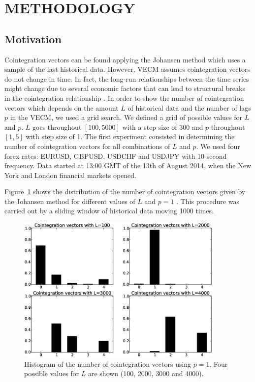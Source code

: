 \section{\uppercase{Methodology}} \label{sec:methodology}
\subsection{Motivation} \label{sec:proposal}

Cointegration vectors can be found applying the Johansen method which uses a
sample of the last historical data. However, VECM assumes cointegration vectors do not change in time.
In fact, the long-run relationships between the time series might change due to
several economic factors that can lead to structural breaks in the cointegration
relationship \cite{gregoryETal1996}. 
In order to show the number of cointegration vectors which depends on 
the amount $L$ of historical data and the number of lags $p$ in the VECM, we used a grid search. We defined a grid of possible values for $L$ and $p$. $L$ goes throughout $[100,5000]$ with a step size of 300 and $p$  throughout $[1,5]$ with step size of 1. The first experiment consisted in determining the number of cointegration vectors for all combinations of $L$ and $p$.
We used four forex rates: EURUSD, GBPUSD, USDCHF and USDJPY with 10-second frequency. Data started at 13:00 GMT of the 13th of August 2014,
when the New York and London financial markets opened.

Figure~\ref{fig:hists} shows the distribution of the number of cointegration vectors 
given by the Johansen method for different values of $L$ and $p=1$ . This procedure was carried out by a sliding window of historical data moving 1000 times.



\begin{figure}[!h]
  \centering
  \includegraphics[width=0.9\textwidth]{img/histCointVectors-offset20520-p-1-freq-10s}
  \caption{Histogram of the number of cointegration vectors using $p=1$. Four
  possible values for $L$ are shown (100, 2000, 3000 and 4000).}
  \label{fig:hists}
\end{figure}

